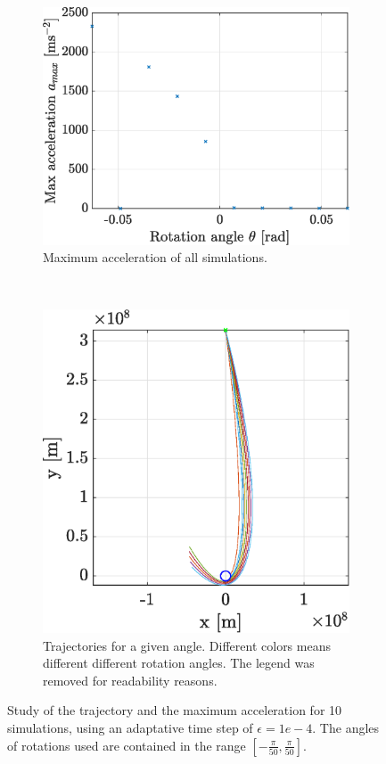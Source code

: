 \documentclass[a4paper,12pt,twoside]{article}
\begin{document}
\begin{figure}[h]
  \centering
  \begin{subfigure}[t]{0.45\textwidth}
    \includegraphics[width=\textwidth]{graphs/ex2b_convacc.eps}
    \caption{Maximum acceleration of all simulations.}
    \label{fig:2b_min_a_traj}
  \end{subfigure}
  ~
  \begin{subfigure}[t]{0.45\textwidth}
    \includegraphics[width=\textwidth]{graphs/ex2b_traj.eps}
    \caption{Trajectories for a given angle. Different colors means different different rotation angles. The legend was removed for readability reasons.}
    \label{fig:2b_min_a_comp}
  \end{subfigure}
  \caption{Study of the trajectory and the maximum acceleration for \num{10} simulations, using an adaptative time step of $\epsilon=1e-4$. The angles of rotations used are contained in the range $[-\frac{\pi}{50}, \frac{\pi}{50}]$.}
  \label{fig:2b_min_a}
\end{figure}
\end{document}
